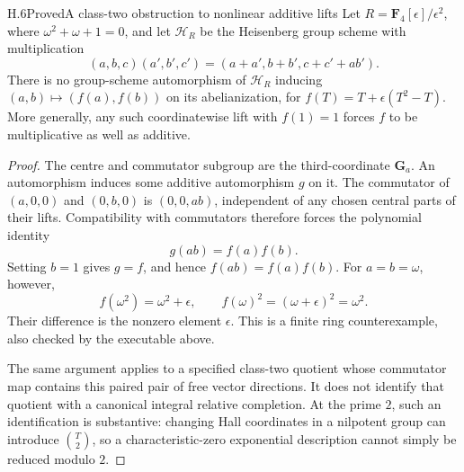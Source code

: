 \begin{statement}{H.6}{Proved}{A class-two obstruction to nonlinear additive lifts}
Let $R=\mathbf F_4[\epsilon]/\epsilon^2$, where
$\omega^2+\omega+1=0$, and let $\mathscr H_R$ be the Heisenberg
group scheme with multiplication
\[
 (a,b,c)(a',b',c')=(a+a',b+b',c+c'+ab').
\]
There is no group-scheme automorphism of $\mathscr H_R$ inducing
$(a,b)\mapsto(f(a),f(b))$ on its abelianization, for
$f(T)=T+\epsilon(T^2-T)$. More generally, any such coordinatewise
lift with $f(1)=1$ forces $f$ to be multiplicative as well as
additive.
\end{statement}
\begin{proof}
The centre and commutator subgroup are the third-coordinate
$\mathbf G_a$. An automorphism induces some additive automorphism
$g$ on it. The commutator of $(a,0,0)$ and $(0,b,0)$ is
$(0,0,ab)$, independent of any chosen central parts of their lifts.
Compatibility with commutators therefore forces the polynomial
identity
\[
                    g(ab)=f(a)f(b).
\]
Setting $b=1$ gives $g=f$, and hence $f(ab)=f(a)f(b)$.
For $a=b=\omega$, however,
\[
 f(\omega^2)=\omega^2+\epsilon,
 \qquad f(\omega)^2=(\omega+\epsilon)^2=\omega^2.
\]
Their difference is the nonzero element $\epsilon$. This is a
finite ring counterexample, also checked by the executable above.

The same argument applies to a specified class-two quotient whose
commutator map contains this paired pair of free vector directions.
It does not identify that quotient with a canonical integral
relative completion. At the prime $2$, such an identification is
substantive: changing Hall coordinates in a nilpotent group can
introduce $\binom{T}{2}$, so a characteristic-zero exponential
description cannot simply be reduced modulo $2$.
\end{proof}

